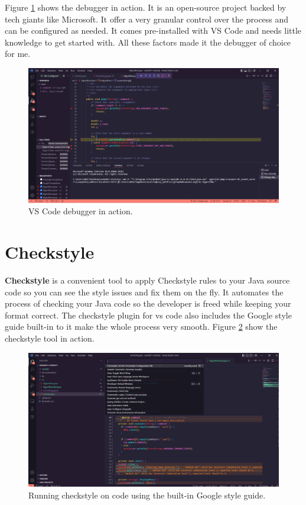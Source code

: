 \documentclass[11pt,a4paper]{report}
\theoremstyle{definition}
\theoremstyle{remark}
\begin{document}
        Figure \ref{fig:vs_code_debugger} shows the debugger in action. It is an open-source project backed by tech giants like Microsoft. It offer a very granular control over the process and can be configured as needed. It comes pre-installed with VS Code and needs little knowledge to get started with. All these factors made it the debugger of choice for me.
    
            \begin{figure}[htbp]
                \centering
                \includegraphics[width=\linewidth]{debugger.PNG}
                \caption{VS Code debugger in action.}
                \label{fig:vs_code_debugger}
            \end{figure}
            
        \section{Checkstyle}
        \textbf{Checkstyle} is a convenient tool to apply Checkstyle rules to your Java source code so you can see the style issues and fix them on the fly. It automates the process of checking your Java code so the developer is freed while keeping your format correct. The checkstyle plugin for vs code also includes the Google style guide built-in to it make the whole process very smooth. Figure \ref{fig:vs_code_checkstyle} show the checkstyle tool in action.
        
            \begin{figure}[htbp]
                \centering
                \includegraphics[width=\linewidth]{checkstyle.PNG}
                \caption{Running checkstyle on code using the built-in Google style guide.}
                \label{fig:vs_code_checkstyle}
            \end{figure}
        
\end{document}
